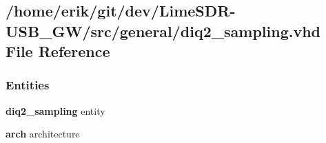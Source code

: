 \subsection{/home/erik/git/dev/\+Lime\+S\+D\+R-\/\+U\+S\+B\+\_\+\+G\+W/src/general/diq2\+\_\+sampling.vhd File Reference}
\label{diq2__sampling_8vhd}
\subsubsection*{Entities}
\begin{DoxyCompactItemize}
\item 
{\bf diq2\+\_\+sampling} entity
\item 
{\bf arch} architecture
\end{DoxyCompactItemize}
